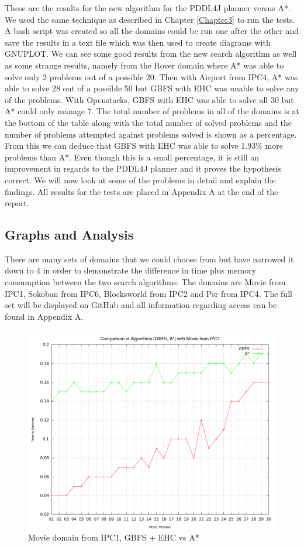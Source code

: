 These are the results for the new algorithm for the PDDL4J planner versus A*. We used the same technique as described in Chapter \ref{Chapter3} to run the tests. A bash script was created so all the domains could be run one after the other and save the results in a text file which was then used to create diagrams with GNUPLOT. We can see some good results from the new search algorithm as well as some strange results, namely from the Rover domain where A* was able to solve only 2 problems out of a possible 20. Then with Airport from IPC4, A* was able to solve 28 out of a possible 50 but GBFS with EHC was unable to solve any of the problems. With Openstacks, GBFS with EHC was able to solve all 30 but A* could only manage 7.
The total number of problems in all of the domains is at the bottom of the table along with the total number of solved problems and the number of problems attempted against problems solved is shown as a percentage. From this we can deduce that GBFS with EHC was able to solve 1.93\% more problems than A*. Even though this is a small percentage, it is still an improvement in regards to the PDDL4J planner and it proves the hypothesis correct. We will now look at some of the problems in detail and explain the findings. All results for the tests are placed in Appendix A at the end of the report. 
\subsection{Graphs and Analysis}
There are many sets of domains that we could choose from but have narrowed it down to 4 in order to demonstrate the difference in time plus memory consumption between the two search algorithms. The domains are Movie from IPC1, Sokoban from IPC6, Blocksworld from IPC2 and Psr from IPC4. The full set will be displayed on GitHub and all information regarding access can be found in Appendix A.
\\
\begin{figure}[!htb]
    \centering
    \includegraphics[scale=0.35]{MovieTime.png}
    \caption{Movie domain from IPC1, GBFS + EHC vs A* }
    \label{fig:MovieDomainTime}
\end{figure} 

